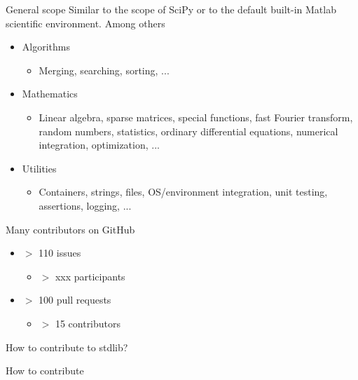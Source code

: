 \documentclass{beamer}
\begin{document}
\begin{frame}[t]{General scope}
	Similar to the scope of SciPy or to the default built-in Matlab scientific environment.
        Among others
	\begin{itemize}
		\item Algorithms
		\begin{itemize}
			\item Merging, searching, sorting, ...
		\end{itemize}
		\item Mathematics
		\begin{itemize}
			\item Linear algebra, sparse matrices, special functions, fast Fourier transform, random numbers, statistics, ordinary differential equations, numerical integration, optimization, ...
		\end{itemize}
		\item Utilities
		\begin{itemize}
			\item Containers, strings, files, OS/environment integration, unit testing, assertions, logging, ...
		\end{itemize}
	\end{itemize}
\end{frame}

\begin{frame}[c]{Many contributors on GitHub}
	\begin{itemize}
		\item $>$ 110 issues
		\begin{itemize}
			\item $>$ xxx participants
		\end{itemize}
		\item $>$ 100 pull requests
		\begin{itemize}
			\item $>$ 15 contributors
		\end{itemize}
	\end{itemize}	
\end{frame}

\begin{frame}[c]{How to contribute to stdlib?}
	
\end{frame}
\begin{frame}[t]{How to contribute}
	
\end{frame}
\end{document}

